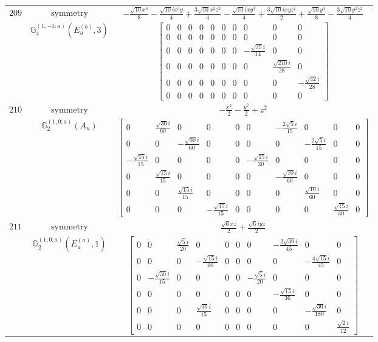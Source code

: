 \documentclass[fleqn,8pt,landscape]{jsarticle}
\begin{document}
\begin{longtable}{ccc}
$ 209 $ & $ \text{symmetry} $ & $ - \frac{\sqrt{10} x^{4}}{8} - \frac{\sqrt{10} i x^{3} y}{4} + \frac{3 \sqrt{10} x^{2} z^{2}}{4} - \frac{\sqrt{10} i x y^{3}}{4} + \frac{3 \sqrt{10} i x y z^{2}}{2} + \frac{\sqrt{10} y^{4}}{8} - \frac{3 \sqrt{10} y^{2} z^{2}}{4} $ \\
$  $ & $ \mathbb{G}_{4}^{(1,-1;a)}(E_{u}^{(b)},3) $ & $ \begin{bmatrix} 0 & 0 & 0 & 0 & 0 & 0 & 0 & 0 & 0 & 0 \\ 0 & 0 & 0 & 0 & 0 & 0 & 0 & 0 & 0 & 0 \\ 0 & 0 & 0 & 0 & 0 & 0 & 0 & - \frac{\sqrt{35} i}{14} & 0 & 0 \\ 0 & 0 & 0 & 0 & 0 & 0 & 0 & 0 & \frac{\sqrt{210} i}{28} & 0 \\ 0 & 0 & 0 & 0 & 0 & 0 & 0 & 0 & 0 & - \frac{\sqrt{42} i}{28} \\ 0 & 0 & 0 & 0 & 0 & 0 & 0 & 0 & 0 & 0 \end{bmatrix} $ \\ \hline
$ 210 $ & $ \text{symmetry} $ & $ - \frac{x^{2}}{2} - \frac{y^{2}}{2} + z^{2} $ \\
$  $ & $ \mathbb{G}_{2}^{(1,0;a)}(A_{u}) $ & $ \begin{bmatrix} 0 & \frac{\sqrt{30} i}{60} & 0 & 0 & 0 & 0 & - \frac{2 \sqrt{5} i}{15} & 0 & 0 & 0 \\ 0 & 0 & - \frac{\sqrt{30} i}{60} & 0 & 0 & 0 & 0 & - \frac{2 \sqrt{5} i}{15} & 0 & 0 \\ - \frac{\sqrt{15} i}{15} & 0 & 0 & 0 & 0 & - \frac{\sqrt{15} i}{30} & 0 & 0 & 0 & 0 \\ 0 & \frac{\sqrt{15} i}{15} & 0 & 0 & 0 & 0 & - \frac{\sqrt{10} i}{60} & 0 & 0 & 0 \\ 0 & 0 & \frac{\sqrt{15} i}{15} & 0 & 0 & 0 & 0 & \frac{\sqrt{10} i}{60} & 0 & 0 \\ 0 & 0 & 0 & - \frac{\sqrt{15} i}{15} & 0 & 0 & 0 & 0 & \frac{\sqrt{15} i}{30} & 0 \end{bmatrix} $ \\ \hline
$ 211 $ & $ \text{symmetry} $ & $ \frac{\sqrt{6} x z}{2} + \frac{\sqrt{6} i y z}{2} $ \\
$  $ & $ \mathbb{G}_{2}^{(1,0;a)}(E_{u}^{(a)},1) $ & $ \begin{bmatrix} 0 & 0 & \frac{\sqrt{5} i}{20} & 0 & 0 & 0 & 0 & - \frac{2 \sqrt{30} i}{45} & 0 & 0 \\ 0 & 0 & 0 & - \frac{\sqrt{15} i}{60} & 0 & 0 & 0 & 0 & - \frac{4 \sqrt{15} i}{45} & 0 \\ 0 & - \frac{\sqrt{30} i}{15} & 0 & 0 & 0 & 0 & - \frac{\sqrt{5} i}{20} & 0 & 0 & 0 \\ 0 & 0 & 0 & 0 & 0 & 0 & 0 & - \frac{\sqrt{15} i}{36} & 0 & 0 \\ 0 & 0 & 0 & \frac{\sqrt{30} i}{15} & 0 & 0 & 0 & 0 & - \frac{\sqrt{30} i}{180} & 0 \\ 0 & 0 & 0 & 0 & 0 & 0 & 0 & 0 & 0 & \frac{\sqrt{2} i}{12} \end{bmatrix} $ \\ \hline

\end{longtable}
\end{document}
